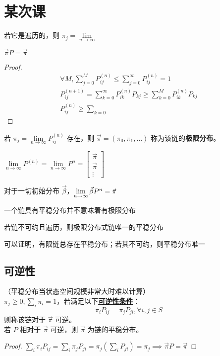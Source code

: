 \documentclass[./main.tex]{subfiles}
\begin{document}
\section{某次课}

\begin{enumerate*}
    \item 若它是遍历的，则 $\pi_j=\lim\limits_{n\rightarrow\infty}$
\end{enumerate*}
$\vec{\pi} P=\vec{\pi}$
\begin{proof}
    \begin{align*}
    \forall M,\sum_{j=0}^{M}P_{ij}^{(n)}\le\sum_{j=0}^{\infty}P_{ij}^{(n)}=1\\
    P_{ij}^{(n+1)}=\sum_{k=0}^{\infty}P_{ik}^{(n)}P_{kj}\ge\sum_{k=0}^MP_{ik}^{(n)}P_{kj}\\
    P_{ij}^{(n)}\ge\sum_{k=0}
    \end{align*}
\end{proof}
若 $\pi_j=\lim\limits_{n\rightarrow\infty}P_{ij}^{(n)}$ 存在，则 $\vec{\pi}=(\pi_0,\pi_1,\dots)$ 称为该链的\textbf{极限分布}。\\
\begin{enumerate*}
    \item $\lim\limits_{n\rightarrow\infty}P^{(n)}=\lim\limits_{n\rightarrow\infty}P^n=\begin{bmatrix}\vec{\pi}\\\vec{\pi}\\\vdots\end{bmatrix}$
    \item 对于一切初始分布 $\vec{\beta}$，$\lim\limits_{n\rightarrow\infty}\vec\beta P^n=\vec{\pi}$
    \item 一个链具有平稳分布并不意味着有极限分布
    \item 若链不可约且遍历，则极限分布式链唯一的平稳分布
    \item 可以证明，有限链总存在平稳分布；若其不可约，则平稳分布唯一
\end{enumerate*}
\subsection{可逆性}
（平稳分布当状态空间规模非常大时难以计算）\\
$\pi_j\ge 0,\sum_i\pi_i=1$，若满足以下\underline{\textbf{可逆性条件}}：
\begin{equation}
    \pi_iP_{ij}=\pi_jP_{ji},\forall i,j\in S
\end{equation}
则称该链对于 $\vec{\pi}$ 可逆。\\
若 $P$ 相对于 $\vec{\pi}$ 可逆，则 $\vec{\pi}$ 为链的平稳分布。
\begin{proof}
    $\sum_i\pi_iP_{ij}=\sum_i\pi_jP_{ji}=\pi_j(\sum_{i}P_{ji})=\pi_j\implies\vec{\pi}P=\vec{\pi}$
\end{proof}
\end{document}
